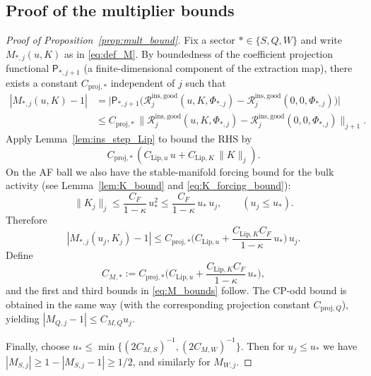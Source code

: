 \subsection*{Proof of the multiplier bounds}

\begin{proof}[Proof of Proposition~\ref{prop:mult_bound}]
Fix a sector $*\in\{S,Q,W\}$ and write $M_{*,j}(u,K)$ as in \eqref{eq:def_M}.
By boundedness of the coefficient projection functional $\mathsf P_{*,j+1}$ (a finite-dimensional component of the extraction map),
there exists a constant $C_{\mathrm{proj},*}$ independent of $j$ such that
\begin{align*}
|M_{*,j}(u,K)-1|
&=\Big|\mathsf P_{*,j+1}\big(\mathcal R^{\mathrm{ins,good}}_j(u,K,\Phi_{*,j})-\mathcal R^{\mathrm{ins,good}}_j(0,0,\Phi_{*,j})\big)\Big|\\
&\le C_{\mathrm{proj},*}\,\big\|\mathcal R^{\mathrm{ins,good}}_j(u,K,\Phi_{*,j})-\mathcal R^{\mathrm{ins,good}}_j(0,0,\Phi_{*,j})\big\|_{j+1}.
\end{align*}
Apply Lemma~\ref{lem:ins_step_Lip} to bound the RHS by
\[
C_{\mathrm{proj},*}\,(C_{\mathrm{Lip},u}\,u + C_{\mathrm{Lip},K}\,\|K\|_j).
\]
On the AF ball we also have the stable-manifold forcing bound for the bulk activity
(see Lemma~\ref{lem:K_bound} and \eqref{eq:K_forcing_bound}):
\[
\|K_j\|_j\le \frac{C_F}{1-\kappa}\,u_\ast^2 \le \frac{C_F}{1-\kappa}\,u_\ast\,u_j,
\qquad (u_j\le u_\ast).
\]
Therefore
\[
|M_{*,j}(u_j,K_j)-1|
\le C_{\mathrm{proj},*}\Big(C_{\mathrm{Lip},u}+\frac{C_{\mathrm{Lip},K}C_F}{1-\kappa}\,u_\ast\Big)\,u_j.
\]
Define
\[
C_{M,*}:=C_{\mathrm{proj},*}\Big(C_{\mathrm{Lip},u}+\frac{C_{\mathrm{Lip},K}C_F}{1-\kappa}\,u_\ast\Big),
\]
and the first and third bounds in \eqref{eq:M_bounds} follow.
The CP-odd bound is obtained in the same way (with the corresponding projection constant $C_{\mathrm{proj},Q}$),
yielding $|M_{Q,j}-1|\le C_{M,Q}u_j$.

Finally, choose $u_\ast\le\min\{(2C_{M,S})^{-1},(2C_{M,W})^{-1}\}$.
Then for $u_j\le u_\ast$ we have $|M_{S,j}|\ge 1-|M_{S,j}-1|\ge 1/2$, and similarly for $M_{W,j}$.
\end{proof}
